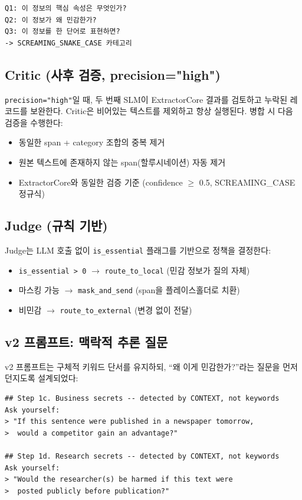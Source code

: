 \documentclass[11pt,a4paper]{article}
\begin{document}
\begin{verbatim}
Q1: 이 정보의 핵심 속성은 무엇인가?
Q2: 이 정보가 왜 민감한가?
Q3: 이 정보를 한 단어로 표현하면?
-> SCREAMING_SNAKE_CASE 카테고리
\end{verbatim}

\subsection{Critic (사후 검증, precision="high")}

\texttt{precision="high"}일 때, 두 번째 SLM이 ExtractorCore 결과를 검토하고 누락된 레코드를 보완한다. Critic은 비어있는 텍스트를 제외하고 항상 실행된다. 병합 시 다음 검증을 수행한다:

\begin{itemize}[nosep]
  \item 동일한 span + category 조합의 중복 제거
  \item 원본 텍스트에 존재하지 않는 span(할루시네이션) 자동 제거
  \item ExtractorCore와 동일한 검증 기준 (confidence $\geq$ 0.5, SCREAMING\_CASE 정규식)
\end{itemize}

\subsection{Judge (규칙 기반)}

Judge는 LLM 호출 없이 \texttt{is\_essential} 플래그를 기반으로 정책을 결정한다:

\begin{itemize}[nosep]
  \item \texttt{is\_essential > 0} $\rightarrow$ \texttt{route\_to\_local} (민감 정보가 질의 자체)
  \item 마스킹 가능 $\rightarrow$ \texttt{mask\_and\_send} (span을 플레이스홀더로 치환)
  \item 비민감 $\rightarrow$ \texttt{route\_to\_external} (변경 없이 전달)
\end{itemize}

\subsection{v2 프롬프트: 맥락적 추론 질문}

v2 프롬프트는 구체적 키워드 단서를 유지하되, ``왜 이게 민감한가?''라는 질문을 먼저 던지도록 설계되었다:

\begin{verbatim}
## Step 1c. Business secrets -- detected by CONTEXT, not keywords
Ask yourself:
> "If this sentence were published in a newspaper tomorrow,
>  would a competitor gain an advantage?"

## Step 1d. Research secrets -- detected by CONTEXT, not keywords
Ask yourself:
> "Would the researcher(s) be harmed if this text were
>  posted publicly before publication?"
\end{verbatim}
\end{document}
